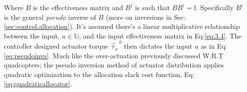 Where $B$ is the effectiveness matrix and $B^{\dagger}$ is such that $BB^{\dagger}=\mathbb{I}$. Specifically $B^{\dagger}$ is the general \emph{pseudo} inverse of $B$ (more on inversions in Sec:\ref{sec:control.allocation}). It's assumed there's a linear multiplicative relationship between the input, $u\in\mathbb{U}$, and the input effectiveness matrix in Eq:\ref{eq:3.4}. The controller designed actuator torque ${\vec{\tau}_a}^{\hspace{3pt}b}$ then dictates the input $u$ as in Eq:\ref{eq:pseudoinva}. Much like the over-actuation previously discussed W.R.T quadcopters; the pseudo inversion method of actuator distribution applies quadratic optimization to the allocation slack cost function, Eq:\ref{eq:quadraticallocator}. 